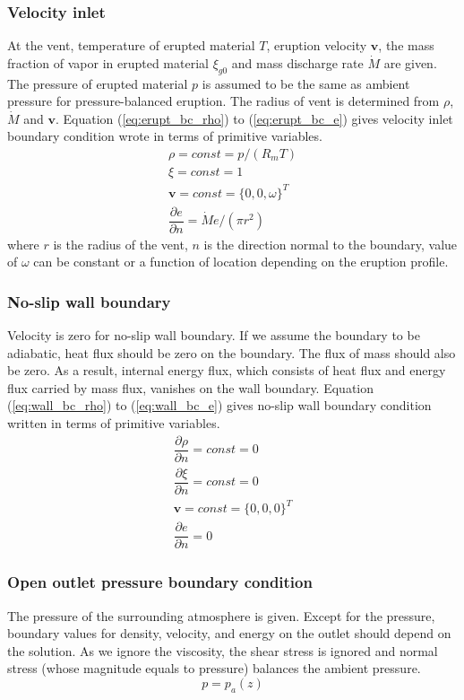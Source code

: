 \subsubsection{Velocity inlet}
At the vent, temperature of erupted material $T$, eruption velocity $\textbf{v}$, the mass fraction of vapor in erupted material $\xi_{g0}$ and mass discharge rate $\dot M$ are given. The pressure of erupted material $p$ is assumed to be the same as ambient pressure for pressure-balanced eruption. The radius of vent is determined from $\rho$, $\dot M$ and $\textbf{v}$. Equation (\ref{eq:erupt_bc_rho}) to (\ref{eq:erupt_bc_e}) gives velocity inlet boundary condition wrote in terms of primitive variables.
\begin{align}
\rho =const = p/\left(R_m T\right) \label{eq:erupt_bc_rho} \\
\xi=const=1 \label{eq:erupt_bc_xi}\\
\textbf{v} = const =\{0,0, \omega \}^T \label{eq:erupt_bc_v}\\
\dfrac{\partial e}{\partial n}=\dot M e /\left(\pi r^2\right) \label{eq:erupt_bc_e}
\end{align} 
where $r$ is the radius of the vent, $n$ is the direction normal to the boundary, value of $\omega$ can be constant or a function of location depending on the eruption profile.

\subsubsection{No-slip wall boundary}
Velocity is zero for no-slip wall boundary. If we assume the boundary to be adiabatic, heat flux should be zero on the boundary. The flux of mass should also be zero. As a result, internal energy flux, which consists of heat flux and energy flux carried by mass flux, vanishes on the wall boundary. Equation (\ref{eq:wall_bc_rho}) to (\ref{eq:wall_bc_e}) gives no-slip wall boundary condition written in terms of primitive variables.
\begin{align}
\dfrac{\partial \rho}{\partial n} = const = 0\label{eq:wall_bc_rho} \\
\dfrac{\partial \xi}{\partial n} = const = 0 \label{eq:wall_bc_xi}\\ 
\textbf{v} = const =\{0,0,0\}^T \label{eq:wall_bc_v}\\
\dfrac{\partial e }{\partial n} = 0\label{eq:wall_bc_e}
\end{align} 

\subsubsection{Open outlet pressure boundary condition}
The pressure of the surrounding atmosphere is given. Except for the pressure, boundary values for density, velocity, and energy on the outlet should depend on the solution. As we ignore the viscosity, the shear stress is ignored and normal stress (whose magnitude equals to pressure) balances the ambient pressure.
\begin{equation}
p = p_a\left(z\right)  \label{eq:pressure_bc_p} 
\end{equation}

